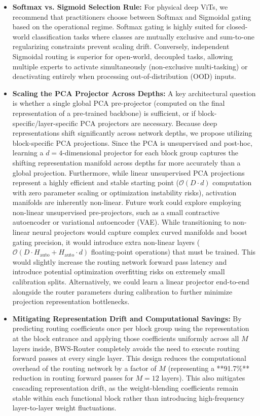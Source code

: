 \begin{itemize}
    \item \textbf{Softmax vs. Sigmoid Selection Rule:} For physical deep ViTs, we recommend that practitioners choose between Softmax and Sigmoidal gating based on the operational regime. Softmax gating is highly suited for closed-world classification tasks where classes are mutually exclusive and sum-to-one regularizing constraints prevent scaling drift. Conversely, independent Sigmoidal routing is superior for open-world, decoupled tasks, allowing multiple experts to activate simultaneously (non-exclusive multi-tasking) or deactivating entirely when processing out-of-distribution (OOD) inputs.
    \item \textbf{Scaling the PCA Projector Across Depths:} A key architectural question is whether a single global PCA pre-projector (computed on the final representation of a pre-trained backbone) is sufficient, or if block-specific/layer-specific PCA projectors are necessary. Because deep representations shift significantly across network depths, we propose utilizing block-specific PCA projections. Since the PCA is unsupervised and post-hoc, learning a $d=4$-dimensional projector for each block group captures the shifting representation manifold across depths far more accurately than a global projection. Furthermore, while linear unsupervised PCA projections represent a highly efficient and stable starting point ($\mathcal{O}(D \cdot d)$ computation with zero parameter scaling or optimization instability risks), activation manifolds are inherently non-linear. Future work could explore employing non-linear unsupervised pre-projectors, such as a small contractive autoencoder or variational autoencoder (VAE). While transitioning to non-linear neural projectors would capture complex curved manifolds and boost gating precision, it would introduce extra non-linear layers ($\mathcal{O}(D \cdot H_{\text{auto}} + H_{\text{auto}} \cdot d)$ floating-point operations) that must be trained. This would slightly increase the routing network forward pass latency and introduce potential optimization overfitting risks on extremely small calibration splits. Alternatively, we could learn a linear projector end-to-end alongside the router parameters during calibration to further minimize projection representation bottlenecks.
    \item \textbf{Mitigating Representation Drift and Computational Savings:} By predicting routing coefficients once per block group using the representation at the block entrance and applying those coefficients uniformly across all $M$ layers inside, BWS-Router completely avoids the need to execute routing forward passes at every single layer. This design reduces the computational overhead of the routing network by a factor of $M$ (representing a **91.7\%** reduction in routing forward passes for $M=12$ layers). This also mitigates cascading representation drift, as the weight-blending coefficients remain stable within each functional block rather than introducing high-frequency layer-to-layer weight fluctuations.

\end{itemize}
